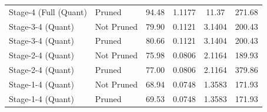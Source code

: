 \begin{table}
\begin{tabular}{llcccc}
Stage-4 (Full
(Quant) & Pruned & 94.48 & 1.1177 & 11.37 & 271.68 \\
Stage-3-4
(Quant) & Not Pruned & 79.90 & 0.1121 & 3.1404 & 200.43 \\
Stage-3-4
(Quant) & Pruned & 80.66 & 0.1121 & 3.1404 & 200.43 \\
Stage-2-4
(Quant) & Not Pruned & 75.98 & 0.0806 & 2.1164 & 189.93 \\
Stage-2-4
(Quant) & Pruned & 77.00 & 0.0806 & 2.1164 & 379.86 \\
Stage-1-4
(Quant) & Not Pruned & 68.94 & 0.0748 & 1.3583 & 171.93 \\
Stage-1-4
(Quant) & Pruned & 69.53 & 0.0748 & 1.3583 & 171.93 \\
\bottomrule
\end{tabular}
\end{table}

